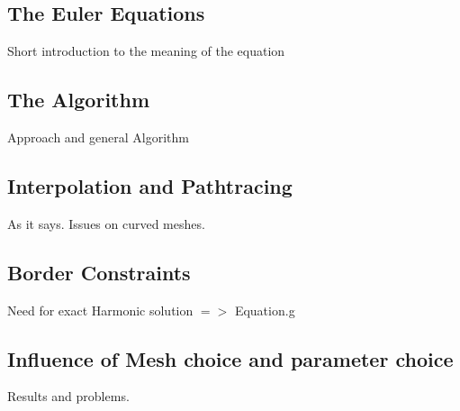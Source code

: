 \documentclass[]{scrbook}
\begin{document}
	\subsection{The Euler Equations}
	Short introduction to the meaning of the equation
	\subsection{The Algorithm}
	Approach and general Algorithm
	\subsection{Interpolation and Pathtracing}
	As it says. Issues on curved meshes.
	\subsection{Border Constraints}
	Need for exact Harmonic solution $=>$ Equation.g
	\subsection{Influence of Mesh choice and parameter choice}
	Results and problems.
	
	
	
	
	\nocite{*}
	
	
	
\end{document}
